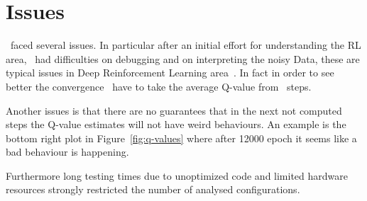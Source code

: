 
\section{Issues}

\Auth~faced several issues. In particular after an initial effort for understanding the RL area, \auth~had difficulties on debugging and on interpreting the noisy Data, these are typical issues in Deep Reinforcement Learning area~\cite{rlblogpost}. In fact in order to see better the convergence \auth~have to take the average Q-value from \numepoch~steps.

Another issues is that there are no guarantees that in the next not computed steps the Q-value estimates will not have weird behaviours. An example is the bottom right plot in Figure~\ref{fig:q-values} where after 12000 epoch it seems like a bad behaviour is happening.

Furthermore long testing times due to unoptimized code and limited hardware resources strongly restricted the number of analysed configurations.

